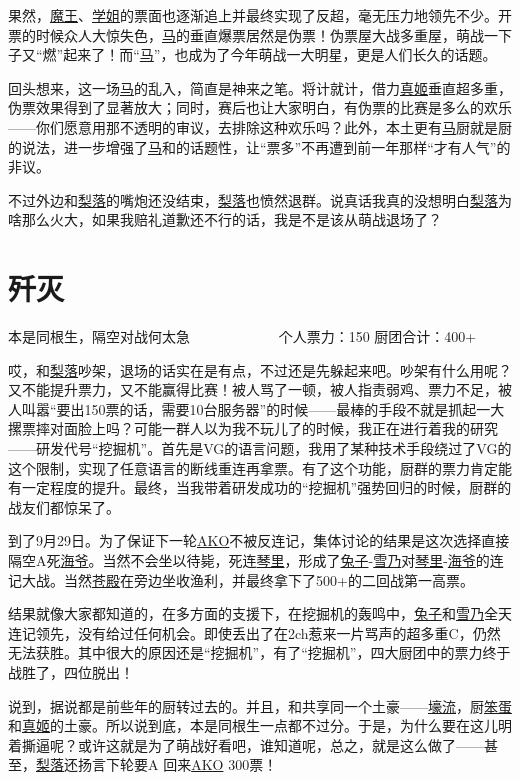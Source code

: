 果然，\uline{魔王}、\uline{学姐}的票面也逐渐追上并最终实现了反超，毫无压力地领先不少。开票的时候众人大惊失色，\uline{马}的垂直爆票居然是伪票！伪票屋大战多重屋，萌战一下子又“燃”起来了！而“\uline{马}”，也成为了今年萌战一大明星，更是人们长久的话题。

回头想来，这一场\uline{马}的乱入，简直是神来之笔。将计就计，借力\uline{真姬}垂直超多重，伪票效果得到了显著放大；同时，赛后也让大家明白，有伪票的比赛是多么的欢乐——你们愿意用那不透明的审议，去排除这种欢乐吗？此外，本土更有\uline{马}厨就是厨的说法，进一步增强了\uline{马}和的话题性，让“票多”不再遭到前一年那样“才有人气”的非议。

不过外边和\uline{梨落}的嘴炮还没结束，\uline{梨落}也愤然退群。说真话我真的没想明白\uline{梨落}为啥那么火大，如果我赔礼道歉还不行的话，我是不是该从萌战退场了？

\chapter{歼灭}
\begin{center}
{\subTitle {}本是同根生，隔空对战何太急}
\subMemo
　　　　　　个人票力：150 厨团合计：400+
\end{center}

哎，和\uline{梨落}吵架，退场的话实在是有点，不过还是先躲起来吧。吵架有什么用呢？又不能提升票力，又不能赢得比赛！被人骂了一顿，被人指责弱鸡、票力不足，被人叫嚣“要出150票的话，需要10台服务器”的时候——最棒的手段不就是抓起一大摞票摔对面脸上吗？可能一群人以为我不玩儿了的时候，我正在进行着我的研究——研发代号“挖掘机”。首先是VG的语言问题，我用了某种技术手段绕过了VG的这个限制，实现了任意语言的断线重连再拿票。有了这个功能，厨群的票力肯定能有一定程度的提升。最终，当我带着研发成功的“挖掘机”强势回归的时候，厨群的战友们都惊呆了。

到了9月29日。为了保证下一轮\uline{AKO}不被反连记，集体讨论的结果是这次选择直接隔空A死\uline{海爷}。当然不会坐以待毙，死连\uline{琴里}，形成了\uline{兔子}-\uline{雪乃}对\uline{琴里}-\uline{海爷}的连记大战。当然\uline{苍殿}在旁边坐收渔利，并最终拿下了500+的二回战第一高票。

结果就像大家都知道的，在多方面的支援下，在挖掘机的轰鸣中，\uline{兔子}和\uline{雪乃}全天连记领先，没有给过任何机会。即使丢出了在2ch惹来一片骂声的超多重C，仍然无法获胜。其中很大的原因还是“挖掘机”，有了“挖掘机”，四大厨团中的票力终于战胜了，四位脱出！

说到，据说都是前些年的厨转过去的。并且，和共享同一个土豪——\uline{壕流}，厨\uline{笨蛋}和\uline{真姬}的土豪。所以说到底，本是同根生一点都不过分。于是，为什么要在这儿明着撕逼呢？或许这就是为了萌战好看吧，谁知道呢，总之，就是这么做了——甚至，\uline{梨落}还扬言下轮要A 回来\uline{AKO} 300票！

